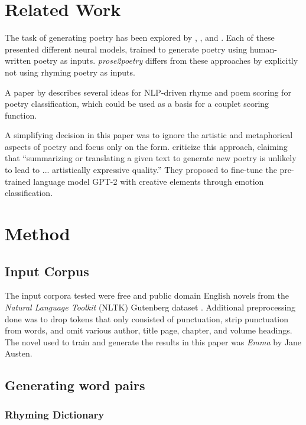 \documentclass[11pt,a4paper]{article}
\begin{document}
\section{Related Work}
\label{sec:related}

The task of generating poetry has been explored by \citet{cole}, \citet{hopkins-kiela-2017}, and \citet{Xie2017DeepP}. Each of these presented different neural models, trained to generate poetry using human-written poetry as inputs. \textit{prose2poetry} differs from these approaches by explicitly not using rhyming poetry as inputs.

A paper by \citet{keswarani} describes several ideas for NLP-driven rhyme and poem scoring for poetry classification, which could be used as a basis for a couplet scoring function.

A simplifying decision in this paper was to ignore the artistic and metaphorical aspects of poetry and focus only on the form. \citet{bena2020introducing} criticize this approach, claiming that ``summarizing or translating a given text to generate new poetry is unlikely to lead to ... artistically expressive quality.'' They proposed to fine-tune the pre-trained language model GPT-2 \cite{gpt2} with creative elements through emotion classification.

\section{Method}
\label{sec:method}

\subsection{Input Corpus}

The input corpora tested were free and public domain English novels from the \textit{Natural Language Toolkit} (NLTK) Gutenberg dataset \cite[Chapter~2]{gutenbergnltk}. Additional preprocessing done was to drop tokens that only consisted of punctuation, strip punctuation from words, and omit various author, title page, chapter, and volume headings. The novel used to train and generate the results in this paper was \textit{Emma} by Jane Austen.

\subsection{Generating word pairs}

\subsubsection{Rhyming Dictionary}
\end{document}
